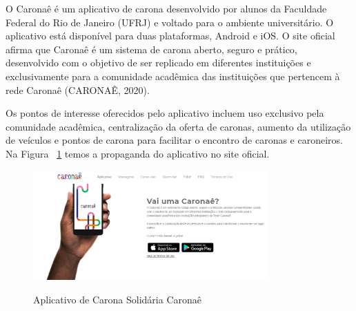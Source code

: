 
O Caronaê é um aplicativo de carona desenvolvido por alunos da Faculdade Federal do Rio de Janeiro (UFRJ) e voltado para o ambiente universitário. O aplicativo está disponível para duas plataformas, Android e iOS. O site oficial afirma que Caronaê é um sistema de carona aberto, seguro e prático, desenvolvido com o objetivo de ser replicado em diferentes instituições e exclusivamente para a comunidade acadêmica das instituições que pertencem à rede Caronaê (CARONAÊ, 2020).

Os pontos de interesse oferecidos pelo aplicativo incluem uso exclusivo pela comunidade acadêmica, centralização da oferta de caronas, aumento da utilização de veículos e pontos de carona para facilitar o encontro de caronas e caroneiros. Na Figura ~\ref{fig:caronae} temos a propaganda do aplicativo no site oficial. %

\begin{figure}[!hbtp]
	\centering
	\caption{Aplicativo de Carona Solidária Caronaê}
	\includegraphics[width=0.8\textwidth]{./04-figuras/caronae.png}
	\label{fig:caronae}
\end{figure}

